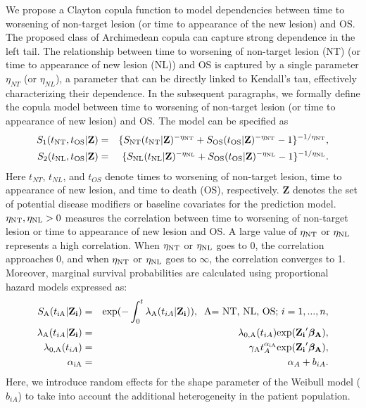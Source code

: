 \documentclass[aoas]{imsart}
\theoremstyle{plain}
\theoremstyle{remark}
\begin{document}
We propose a Clayton copula function  \citep{clayton1978model} to model dependencies between time to worsening of non-target lesion (or time to appearance of the new lesion) and OS. The proposed class of Archimedean copula can capture strong dependence in the left tail. The relationship between time to worsening of non-target lesion (NT) (or time to appearance of new lesion (NL)) and OS is captured by a single parameter $\eta_{NT}$ (or $\eta_{NL}$), a parameter that can be directly linked to Kendall's tau, effectively characterizing their dependence. In the subsequent paragraphs, we formally define the copula model between time to worsening of non-target lesion (or time to appearance of new lesion) and OS. The model can be specified as
\begin{eqnarray*}
S_1(t_{\rm NT},
t_{\rm OS}|\textbf{Z}) &=& \{S_{\rm NT}(t_{\rm NT}|\textbf{Z})^{-\eta_{\rm NT}}
+S_{\rm OS}(t_{\rm OS}|\textbf{Z})^{-\eta_{\rm NT}}-1\}^{-1/\eta_{\rm NT}},\\
S_2(t_{\rm NL},
t_{\rm OS}|\textbf{Z}) &=& \{S_{\rm NL}(t_{\rm NL}|\textbf{Z})^{-\eta_{\rm NL}}
+S_{\rm OS}(t_{\rm OS}|\textbf{Z})^{-\eta_{\rm NL}}-1\}^{-1/\eta_{\rm NL}}. 
\end{eqnarray*}
Here $t_{NT}$, $t_{NL}$, and $t_{OS}$ denote times to worsening of non-target lesion, time to appearance of new lesion, and time to death (OS), respectively. $\textbf{Z}$ denotes the set of potential disease modifiers or baseline covariates for the prediction model. $\eta_{\rm NT}, \eta_{\rm NL}>0$ measures the correlation between time to worsening of non-target lesion or time to appearance of new lesion and OS. A large value of $\eta_{\rm NT}$ or $\eta_{\rm NL}$ represents a high correlation. When $\eta_{\rm NT}$ or $\eta_{\rm NL}$ goes to 0, the correlation approaches 0, and when $\eta_{\rm NT}$ or $\eta_{\rm NL}$ goes to $\infty$, the correlation converges to 1. Moreover, marginal survival probabilities are calculated using proportional hazard models expressed as:
\begin{eqnarray*}
S_{\rm A}(t_{\rm iA}|\mathbf{Z_{i}}) &=& \mathrm{exp}(-\int_{0}^{t} \lambda_{\rm A}(t_{iA}|\mathbf{Z_{i}})), \;\; \mbox{A= NT, NL, OS; $i=1,...,n$}, \\
\lambda_{\rm A}(t_{iA}|\mathbf{Z_{i}}) &=& \lambda_{0, \rm A}(t_{iA})\mathrm{exp}(\mathbf{Z_{i}}' \boldsymbol{\beta_{\rm A}}),\\
\lambda_{0, \rm A}(t_{iA}) &=& \gamma_{\rm A} t_{A}^{\alpha_{\rm iA}}
\mathrm{exp}(\mathbf{Z_{i}}' \boldsymbol{\beta_{\rm A}} ), \\
\alpha_{\rm iA}&=&\alpha_{A} + b_{iA}.
\end{eqnarray*}
Here, we introduce random effects for the shape parameter of the Weibull model ($b_{iA}$) to take into account the additional heterogeneity in the patient population.
\end{document}
